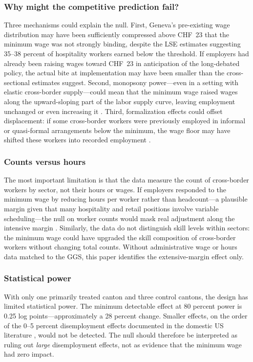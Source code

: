 \documentclass[12pt]{article}
\begin{document}
\subsubsection*{Why might the competitive prediction fail?} Three mechanisms could explain the null. First, Geneva's pre-existing wage distribution may have been sufficiently compressed above CHF~23 that the minimum wage was not strongly binding, despite the LSE estimates suggesting 35--38 percent of hospitality workers earned below the threshold. If employers had already been raising wages toward CHF~23 in anticipation of the long-debated policy, the actual bite at implementation may have been smaller than the cross-sectional estimates suggest. Second, monopsony power---even in a setting with elastic cross-border supply---could mean that the minimum wage raised wages along the upward-sloping part of the labor supply curve, leaving employment unchanged or even increasing it \citep{manning2003}. Third, formalization effects could offset displacement: if some cross-border workers were previously employed in informal or quasi-formal arrangements below the minimum, the wage floor may have shifted these workers into recorded employment \citep{meghir2012, almeida2012}.

\subsubsection*{Counts versus hours} The most important limitation is that the data measure the count of cross-border workers by sector, not their hours or wages. If employers responded to the minimum wage by reducing hours per worker rather than headcount---a plausible margin given that many hospitality and retail positions involve variable scheduling---the null on worker counts would mask real adjustment along the intensive margin \citep{harasztosi2019, dustmann2022}. Similarly, the data do not distinguish skill levels within sectors: the minimum wage could have upgraded the skill composition of cross-border workers without changing total counts. Without administrative wage or hours data matched to the GGS, this paper identifies the extensive-margin effect only.

\subsubsection*{Statistical power} With only one primarily treated canton and three control cantons, the design has limited statistical power. The minimum detectable effect at 80 percent power is 0.25 log points---approximately a 28 percent change. Smaller effects, on the order of the 0--5 percent disemployment effects documented in the domestic US literature \citep{cengiz2019}, would not be detected. The null should therefore be interpreted as ruling out \textit{large} disemployment effects, not as evidence that the minimum wage had zero impact.
\end{document}
